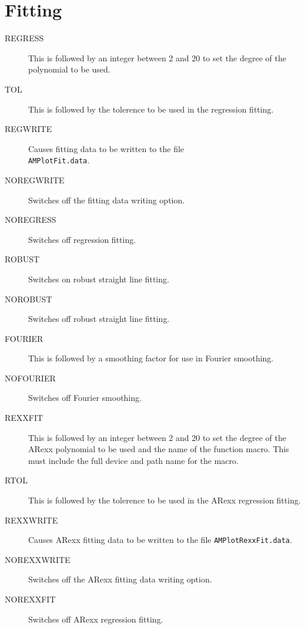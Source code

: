 \section{Fitting}
\begin{description}
\item[REGRESS] This is followed by an integer between 2 and 20 to set the degree 
of the polynomial to be used.
\item[TOL] This is followed by the tolerence to be used in the regression fitting.
\item[REGWRITE] Causes fitting data to be written to the file\\
{\tt AMPlotFit.data}.
\item[NOREGWRITE\dag] Switches off the fitting data writing option.
\item[NOREGRESS\dag] Switches off regression fitting.
\item[ROBUST] Switches on robust straight line fitting.
\item[NOROBUST\dag] Switches off robust straight line fitting.
\item[FOURIER] This is followed by a smoothing factor for use in Fourier 
smoothing.
\item[NOFOURIER\dag] Switches off Fourier smoothing.
\item[REXXFIT] This is followed by an integer between 2 and 20 to set the degree 
of the ARexx polynomial to be used and the name of the function macro. This must 
include the full device and path name for the macro.
\item[RTOL] This is followed by the tolerence to be used in the ARexx regression 
fitting.
\item[REXXWRITE] Causes ARexx fitting data to be written to the file 
{\tt AMPlotRexxFit.data}.
\item[NOREXXWRITE\dag] Switches off the ARexx fitting data writing option.
\item[NOREXXFIT\dag] Switches off ARexx regression fitting.
\end{description}

